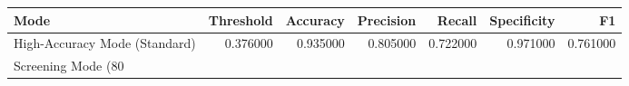 \begin{tabular}{lrrrrrr}
\toprule
Mode & Threshold & Accuracy & Precision & Recall & Specificity & F1 \\
\midrule
High-Accuracy Mode (Standard) & 0.376000 & 0.935000 & 0.805000 & 0.722000 & 0.971000 & 0.761000 \\
Screening Mode (80%
\bottomrule
\end{tabular}
